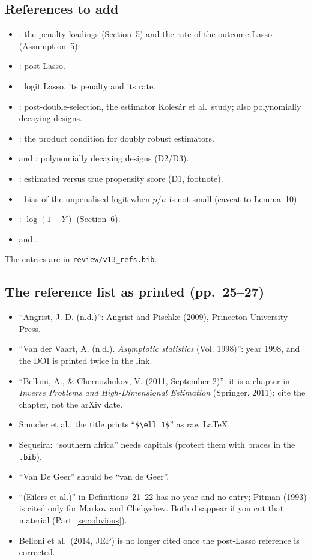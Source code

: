 \documentclass[11pt]{article}
\theoremstyle{plain}
\theoremstyle{remark}
\begin{document}
\subsection{References to add}
\begin{itemize}
\item \textcite{belloni2012sparse}: the penalty loadings (Section~5) and the rate
  of the outcome Lasso (Assumption~5).
\item \textcite{belloni2013least}: post-Lasso.
\item \textcite{belloni2016post}: logit Lasso, its penalty and its rate.
\item \textcite{belloni2014inference}: post-double-selection, the estimator
  Kolesár et al.\ study; also polynomially decaying designs.
\item \textcite{farrell2015robust}: the product condition for doubly robust
  estimators.
\item \textcite{belloni2017program} and \textcite{athey2018approximate}:
  polynomially decaying designs (D2/D3).
\item \textcite{hirano2003efficient}: estimated versus true propensity score
  (D1, footnote).
\item \textcite{sur2019modern}: bias of the unpenalised logit when $p/n$ is not
  small (caveat to Lemma~10).
\item \textcite{chen2024logs}: $\log(1+Y)$ (Section~6).
\item \textcite{snow1855mode} and \textcite{angrist2009mostly}.
\end{itemize}
The entries are in \texttt{review/v13\_refs.bib}.

\subsection{The reference list as printed (pp.~25--27)}
\begin{itemize}
\item ``Angrist, J. D. (n.d.)'': Angrist and Pischke (2009), Princeton University
  Press.
\item ``Van der Vaart, A. (n.d.). \emph{Asymptotic statistics} (Vol. 1998)'': year
  1998, and the DOI is printed twice in the link.
\item ``Belloni, A., \& Chernozhukov, V. (2011, September 2)'': it is a chapter in
  \emph{Inverse Problems and High-Dimensional Estimation} (Springer, 2011);
  cite the chapter, not the arXiv date.
\item Smucler et al.: the title prints ``\verb|$\ell_1$|'' as raw LaTeX.
\item Sequeira: ``southern africa'' needs capitals (protect them with braces in
  the \texttt{.bib}).
\item ``Van De Geer'' should be ``van de Geer''.
\item ``(Eilers et al.)'' in Definitions~21--22 has no year and no entry; Pitman
  (1993) is cited only for Markov and Chebyshev. Both disappear if you cut that
  material (Part~\ref{sec:obvious}).
\item Belloni et al.\ (2014, JEP) is no longer cited once the post-Lasso
  reference is corrected.
\end{itemize}
\end{document}
